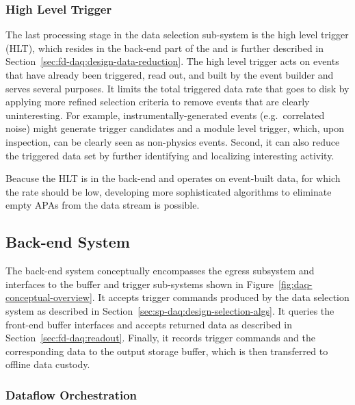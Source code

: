 \subsubsection{High Level Trigger}

The last processing stage in the data selection sub-system is the high
level trigger (HLT),  which resides in the
back-end part of the  and is further described in
Section~\ref{sec:fd-daq:design-data-reduction}. The high level trigger
acts on events that have already been triggered, read out, 
and built by the event builder and serves several purposes. It
limits the total triggered data rate that goes to disk by
applying more refined selection criteria to remove events that are clearly uninteresting. For example, instrumentally-generated events
(e.g.~correlated noise) might generate trigger candidates and a module
level trigger, which, upon inspection, can be clearly seen
as non-physics events. Second, it can also reduce the triggered
data set by further identifying and localizing interesting activity.

Beacuse the HLT is in the  back-end and operates on event-built data, for which the rate
should be low, developing more sophisticated
algorithms to eliminate empty APAs from the data 
stream is possible.

\subsection{Back-end System}
\label{sec:fd-daq:design-backend}

The  back-end system conceptually encompasses the egress subsystem and interfaces to the buffer and trigger sub-systems shown in Figure~\ref{fig:daq-conceptual-overview}. 
It accepts trigger commands produced by the data selection system as described in Section~\ref{sec:sp-daq:design-selection-algs}. 
It queries the front-end buffer interfaces and accepts returned data as described in Section~\ref{sec:fd-daq:readout}. 
Finally, it records trigger commands and the corresponding data to the output storage buffer, which is then transferred to offline data custody.

\subsubsection{Dataflow Orchestration}

